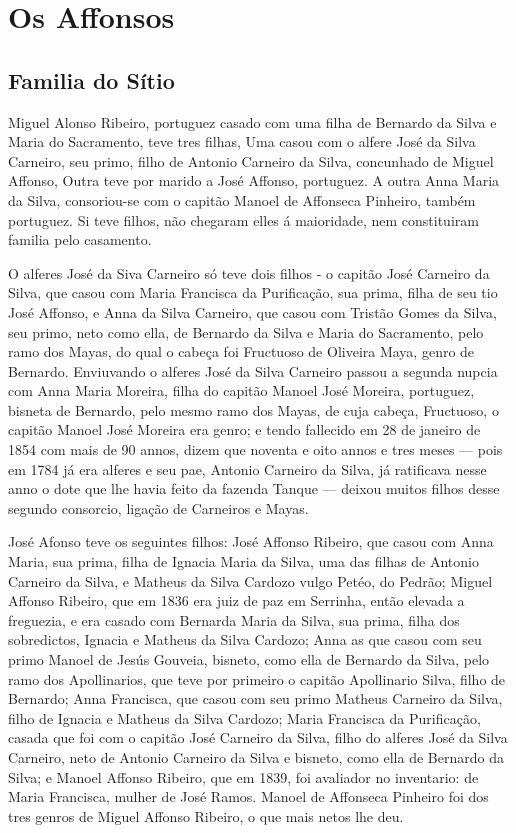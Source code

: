 
\chapter{Os Affonsos}

\begin{centering}
\section*{Familia do Sítio}
\end{centering}
Miguel Alonso Ribeiro, portuguez casado com uma filha de Bernardo da Silva e Maria do Sacramento, teve tres filhas, Uma casou com o alfere José da Silva Carneiro, seu primo, filho de Antonio Carneiro da Silva, concunhado de Miguel Affonso, Outra teve por marido a José Affonso, portuguez. A outra Anna Maria da Silva, consoriou-se com o capitão Manoel de Affonseca Pinheiro, também portuguez. Si teve filhos, não chegaram elles á maioridade, nem constituiram familia pelo casamento.


O alferes José da Siva Carneiro só teve dois filhos - o capitão José Carneiro da Silva, que casou com Maria Francisca da Purificação, sua prima, filha  de seu tio José Affonso, e Anna da Silva Carneiro,  que casou com Tristão Gomes da Silva, seu primo, neto como ella, de Bernardo da Silva e Maria do Sacramento, pelo ramo dos Mayas, do qual o cabeça foi Fructuoso de Oliveira Maya, genro de Bernardo.  Enviuvando o alferes José da Silva Carneiro passou a segunda nupcia com Anna Maria Moreira, filha do  capitão Manoel José Moreira, portuguez, bisneta de Bernardo, pelo mesmo ramo dos Mayas, de cuja cabeça, Fructuoso, o capitão Manoel José Moreira era genro; e tendo fallecido em 28 de janeiro de 1854 com mais de 90 annos, dizem que noventa e oito annos e tres meses — pois em 1784 já era alferes e seu pae, Antonio Carneiro da Silva, já ratificava nesse anno o dote que lhe havia feito da fazenda Tanque — deixou muitos filhos desse segundo consorcio, ligação de Carneiros e Mayas.

José Afonso teve os seguintes filhos: José Affonso Ribeiro, que casou com Anna Maria, sua prima, filha de Ignacia Maria da Silva, uma das filhas de Antonio Carneiro da Silva, e Matheus da Silva Cardozo vulgo Petéo, do Pedrão; Miguel Affonso Ribeiro, que em 1836 era juiz de paz em Serrinha, então elevada a freguezia, e era casado com Bernarda Maria da Silva, sua prima, filha dos sobredictos, Ignacia e Matheus da Silva Cardozo; Anna as que casou com seu primo Manoel de Jesús Gouveia, bisneto, como ella de Bernardo da Silva, pelo ramo dos Apollinarios, que teve por primeiro o capitão Apollinario Silva, filho de Bernardo; Anna Francisca, que casou com seu primo Matheus Carneiro da Silva, filho de Ignacia e Matheus da Silva Cardozo; Maria Francisca da Purificação, casada que foi com o capitão José Carneiro da Silva, filho do alferes José da Silva Carneiro, neto de Antonio Carneiro da Silva e bisneto, como ella de Bernardo da Silva; e Manoel Affonso Ribeiro, que em 1839, foi avaliador no inventario: de Maria Francisca, mulher de José Ramos. Manoel de Affonseca Pinheiro foi dos tres genros de Miguel Affonso Ribeiro, o que mais netos lhe deu.

